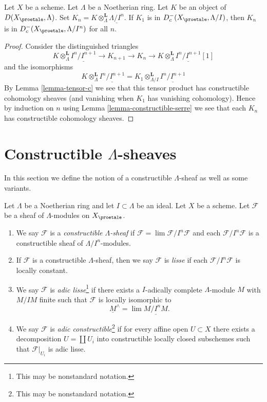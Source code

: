 \begin{lemma}
\label{lemma-compare-truncations-constructible}
Let $X$ be a scheme. Let $\Lambda$ be a Noetherian ring.
Let $K$ be an object of $D(X_\proetale, \Lambda)$.
Set $K_n = K \otimes_\Lambda^\mathbf{L} \underline{\Lambda/I^n}$.
If $K_1$ is in $D^-_c(X_\proetale, \Lambda/I)$, then
$K_n$ is in $D^-_c(X_\proetale, \Lambda/I^n)$ for all $n$.
\end{lemma}

\begin{proof}
Consider the distinguished triangles
$$
K \otimes_\Lambda^\mathbf{L} \underline{I^n/I^{n + 1}} \to
K_{n + 1} \to
K_n \to
K \otimes_\Lambda^\mathbf{L} \underline{I^n/I^{n + 1}}[1]
$$
and the isomorphisms
$$
K \otimes_\Lambda^\mathbf{L} \underline{I^n/I^{n + 1}} =
K_1 \otimes_{\Lambda/I}^\mathbf{L} \underline{I^n/I^{n + 1}}
$$
By Lemma \ref{lemma-tensor-c} we see that this tensor product has
constructible cohomology sheaves (and vanishing when $K_1$ has
vanishing cohomology). Hence by induction on $n$ using
Lemma \ref{lemma-constructible-serre}
we see that each $K_n$ has constructible cohomology sheaves.
\end{proof}








\section{Constructible $\Lambda$-sheaves}
\label{section-adic}

\noindent
In this section we define the notion of a constructible
$\Lambda$-sheaf as well as some variants.

\begin{definition}
\label{definition-adic}
Let $\Lambda$ be a Noetherian ring and let $I \subset \Lambda$ be an ideal.
Let $X$ be a scheme. Let $\mathcal{F}$ be a sheaf of $\Lambda$-modules
on $X_\proetale$.
\begin{enumerate}
\item We say $\mathcal{F}$ is a {\it constructible $\Lambda$-sheaf}
if $\mathcal{F} = \lim \mathcal{F}/I^n\mathcal{F}$ and each
$\mathcal{F}/I^n\mathcal{F}$ is a constructible sheaf of $\Lambda/I^n$-modules.
\item If $\mathcal{F}$ is a constructible $\Lambda$-sheaf, then we say
$\mathcal{F}$ is {\it lisse} if each $\mathcal{F}/I^n\mathcal{F}$ is
locally constant.
\item We say $\mathcal{F}$ is {\it adic lisse}\footnote{This may
be nonstandard notation.} if there exists a
$I$-adically complete $\Lambda$-module $M$ with $M/IM$ finite
such that $\mathcal{F}$ is locally isomorphic to
$$
\underline{M}^\wedge = \lim \underline{M/I^nM}.
$$
\item We say $\mathcal{F}$ is
{\it adic constructible}\footnote{This may be nonstandard notation.}
if for every affine open $U \subset X$
there exists a decomposition $U = \coprod U_i$ into
constructible locally closed subschemes such that $\mathcal{F}|_{U_i}$
is adic lisse.
\end{enumerate}
\end{definition}

